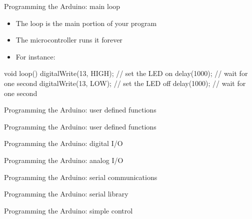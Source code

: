 \documentclass[compress]{beamer}
\begin{document}
\begin{frame}[fragile]{Programming the Arduino: main loop}
    \begin{itemize}
        \item The loop is the main portion of your program
        \item The microcontroller runs it forever
        \item For instance:
    \end{itemize}

            \begin{cppcode}
void loop()
{
    digitalWrite(13, HIGH); // set the LED on
    delay(1000);            // wait for one second
    digitalWrite(13, LOW);  // set the LED off
    delay(1000);            // wait for one second
}

            \end{cppcode}
\end{frame}


{
    \begin{frame}{Programming the Arduino: user defined functions}
    \end{frame}
}

{
    \begin{frame}{Programming the Arduino: user defined functions}
    \end{frame}
}

{
    \begin{frame}{Programming the Arduino: digital I/O}
    \end{frame}
}

{
    \begin{frame}{Programming the Arduino: analog I/O}
    \end{frame}
}

{
    \begin{frame}{Programming the Arduino: serial communications}
    \end{frame}
}

{
    \begin{frame}{Programming the Arduino: serial library}
    \end{frame}
}

{
    \begin{frame}{Programming the Arduino: simple control}
    \end{frame}
}
\end{document}
